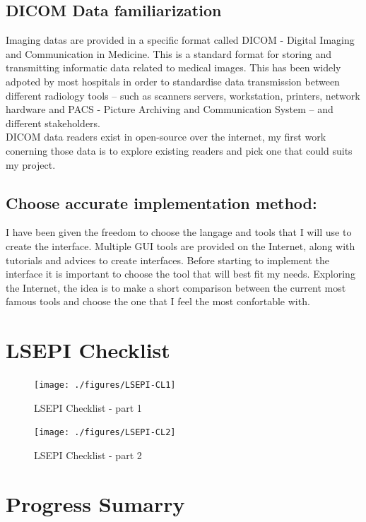 \documentclass[12pt,twoside]{article}
\begin{document}
\subsection{DICOM Data familiarization}
Imaging datas are provided in a specific format called DICOM - Digital Imaging and Communication in Medicine. This is a standard format for storing and transmitting informatic data related to medical images. This has been widely adpoted by most hospitals in order to standardise data transmission between different radiology tools – such as scanners servers, workstation, printers, network hardware and PACS - Picture Archiving and Communication System – and different stakeholders.  \\
DICOM data readers exist in open-source over the internet, my first work conerning those data is to explore existing readers and pick one that could suits my project.
 

\subsection{Choose accurate implementation method:}
I have been given the freedom to choose the langage and tools that I will use to create the interface. Multiple GUI tools are provided on the Internet, along with tutorials and advices to create interfaces. Before starting to implement the interface it is important to choose the tool that will best fit my needs. Exploring the Internet, the idea is to make a short comparison between the current most famous tools and choose the one that I feel the most confortable with.




\clearpage
\section{LSEPI Checklist}

\begin{figure}[ht]
\centering
\texttt{[image: ./figures/LSEPI-CL1]}
\caption{LSEPI Checklist - part 1}
\end{figure}

\clearpage

\begin{figure}[tb]
\centering
\texttt{[image: ./figures/LSEPI-CL2]}
\caption{LSEPI Checklist - part 2}
\end{figure}


\clearpage
\section{Progress Sumarry}
\end{document}
